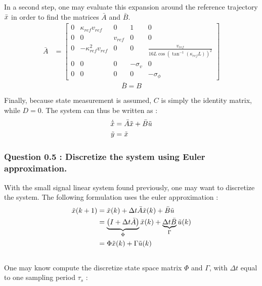 In a second step, one may evaluate this expansion around the reference trajectory $\Bar{x}$ in order to find the matrices $\bar{A}$ and $\bar{B}$.\\
\begin{align}
    \bar{A} &= 
    \left[ {\begin{array}{ccccc}
        0 &\kappa_{ref} v_{ref} &0 &1 &0 \\
        0 &0 &v_{ref} &0 &0\\
        0 &-\kappa_{ref}^2 v_{ref} &0 &0 &\frac{v_{ref}}{16L \cos(\tan^{-1}(\kappa_{ref} L))^2}\\
        0 &0 &0 &-\sigma_v &0\\
        0 &0 &0 &0 &-\sigma_{\phi}
    \end{array} } \right]
\end{align}
\begin{equation}
    \bar{B} = B
\end{equation}

Finally, because state measurement is assumed, $C$ is simply the identity matrix, while $D = 0$. The system can thus be written as : 
\begin{align}
    \dot{\Tilde{x}} &= \Bar{A}\Tilde{x} + \Bar{B}\Tilde{u}\\
    \Tilde{y} &= \Tilde{x}
\end{align}


\subsubsection*{Question 0.5 : Discretize the system using Euler approximation.}
With the small signal linear system found previously, one may want to discretize the system. The following formulation uses the euler approximation :\\

\begin{equation}\begin{align}
    \Tilde{x}(k+1) &= \Tilde{x}(k) + \Delta t \Bar{A}\Tilde{x}(k) + \Bar{B}\Tilde{u}\\
    &= \underbrace{\left(I + \Delta t \Bar{A}\right)}_{\Phi} \Tilde{x}(k) + \underbrace{\Delta t \Bar{B}}_{\Gamma}\Tilde{u}(k)\\
    &= \Phi \Tilde{x}(k) + \Gamma \Tilde{u}(k)
\end{align}\end{equation}
\\
One may know compute the discretize state space matrix $\Phi$ and $\Gamma$, with $\Delta t$ equal to one sampling period $\tau_s$ :

